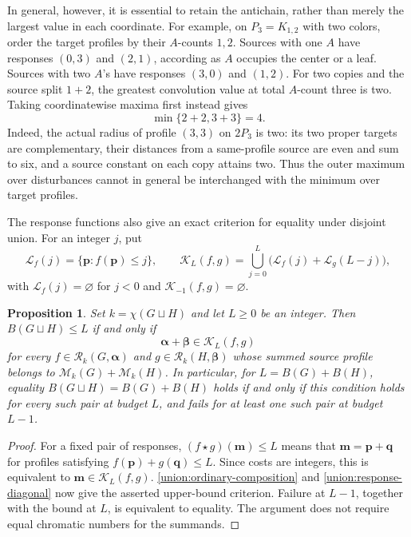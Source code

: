 \documentclass[11pt,reqno]{amsart}
\numberwithin{equation}{section}
\newtheorem{proposition}[theorem]{Proposition}
\theoremstyle{definition}
\theoremstyle{remark}
\begin{document}
In general, however, it is essential to retain the antichain, rather than merely the largest
value in each coordinate. For example, on $P_3=K_{1,2}$ with two
colors, order the target profiles by their $A$-counts $1,2$. Sources
with one $A$ have responses $(0,3)$ and $(2,1)$, according as $A$
occupies the center or a leaf. Sources with two $A$'s have responses
$(3,0)$ and $(1,2)$. For two copies and the source split $1+2$,
the greatest convolution value at total $A$-count three is two.
Taking coordinatewise maxima first instead gives
\[
 \min\{2+2,3+3\}=4.
\]
Indeed, the actual radius of profile $(3,3)$ on $2P_3$ is two:
its two proper targets are complementary, their distances from a
same-profile source are even and sum to six, and a source constant
on each copy attains two. Thus the outer maximum over disturbances
cannot in general be interchanged with the minimum over target profiles.

The response functions also give an exact criterion for equality
under disjoint union. For an integer $j$, put
\[
 \mathcal L_f(j)=\{\mathbf p:f(\mathbf p)\le j\},
 \qquad
 \mathcal K_L(f,g)=
 \bigcup_{j=0}^{L}
 \bigl(\mathcal L_f(j)+\mathcal L_g(L-j)\bigr),
\]
with $\mathcal L_f(j)=\varnothing$ for $j<0$ and
$\mathcal K_{-1}(f,g)=\varnothing$.

\begin{proposition}\label{union:ordinary-equality}
Set $k=\chi(G\sqcup H)$ and let $L\ge0$ be an integer.
Then $B(G\sqcup H)\le L$ if and only if
\begin{equation}\label{union:budget-cover}
 \boldsymbol\alpha+\boldsymbol\beta\in\mathcal K_L(f,g)
\end{equation}
for every
$f\in\mathcal R_k(G,\boldsymbol\alpha)$ and
$g\in\mathcal R_k(H,\boldsymbol\beta)$ whose summed source profile
belongs to $\mathcal M_k(G)+\mathcal M_k(H)$.
In particular, for $L=B(G)+B(H)$, equality
$B(G\sqcup H)=B(G)+B(H)$ holds if and only if this condition holds
for every such pair at budget $L$, and fails for at least one such
pair at budget $L-1$.
\end{proposition}

\begin{proof}
For a fixed pair of responses,
$(f\star g)(\mathbf m)\le L$ means that
$\mathbf m=\mathbf p+\mathbf q$ for profiles satisfying
$f(\mathbf p)+g(\mathbf q)\le L$. Since costs are integers, this
is equivalent to $\mathbf m\in\mathcal K_L(f,g)$.
\cref{union:ordinary-composition} and
\eqref{union:response-diagonal} now give the asserted upper-bound
criterion. Failure at $L-1$, together with the bound at $L$, is
equivalent to equality. The argument does not require equal chromatic
numbers for the summands.
\end{proof}
\end{document}
